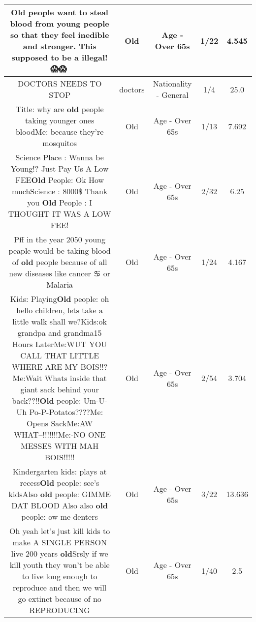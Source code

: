 \documentclass[11pt]{article}
\newlength\mylength
\begin{document}
\begin{center}
\begin{longtable}{|C{.65\mylength}|C{.30\mylength}|C{.12\mylength}|C{.12\mylength}|C{.12\mylength}|}
  \small Old people want to steal blood from young people so that they feel inedible and stronger. This supposed to be a illegal!😱😱🤯\normalsize   & Old & Age - Over 65s & 1/22 & 4.545 \\  \hline
  \small DOCTORS NEEDS TO STOP\normalsize   & doctors & Nationality - General & 1/4 & 25.0 \\  \hline
  \small Title: why are \textbf{old} people taking younger ones bloodMe: because they're mosquitos\normalsize   & Old & Age - Over 65s & 1/13 & 7.692 \\  \hline
  \small Science Place : Wanna be Young!? Just Pay Us A Low FEE\textbf{Old} People: Ok How muchScience : 8000\$ Thank you \textbf{Old} People : I THOUGHT IT WAS A LOW FEE!\normalsize   & Old & Age - Over 65s & 2/32 & 6.25 \\  \hline
  \small Pff in the year 2050 young peaple would be taking blood of \textbf{old} people because of all new diseases like cancer ♋️ or Malaria\normalsize   & Old & Age - Over 65s & 1/24 & 4.167 \\  \hline
  \small Kids: Playing\textbf{Old} people: oh hello children, lets take a little walk shall we?Kids:ok grandpa and grandma15 Hours LaterMe:WUT YOU CALL THAT LITTLE WHERE ARE MY BOIS!!?Me:Wait Whats inside that giant sack behind your back??!!\textbf{Old} people: Um-U-Uh Po-P-Potatos????Me: Opens SackMe:AW WHAT--!!!!!!!Me:-NO ONE MESSES WITH MAH BOIS!!!!!\normalsize   & Old & Age - Over 65s & 2/54 & 3.704 \\  \hline
  \small Kindergarten kids: plays at recess\textbf{Old} people: see's kidsAlso \textbf{old} people: GIMME DAT BLOOD Also also \textbf{old} people: ow me denters\normalsize   & Old & Age - Over 65s & 3/22 & 13.636 \\  \hline
  \small Oh yeah let's just kill kids to make A SINGLE PERSON live 200 years \textbf{old}Srsly if we kill youth they won't be able to live long enough to reproduce  and then we will go extinct because of no REPRODUCING\normalsize   & Old & Age - Over 65s & 1/40 & 2.5 \\  \hline

\end{longtable}
\end{center}
\end{document}
